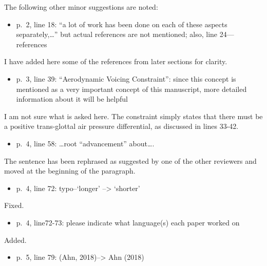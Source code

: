 \documentclass[]{article}
\providecommand{\tightlist}{%
  \setlength{\itemsep}{0pt}\setlength{\parskip}{0pt}}
\begin{document}
The following other minor suggestions are noted:

\begin{itemize}
\tightlist
\item
  p.~2, line 18: ``a lot of work has been done on each of these aspects
  separately,\ldots{}'' but actual references are not mentioned; also,
  line 24---references
\end{itemize}

\color{plum}

I have added here some of the references from later sections for
clarity. \color{black}

\begin{itemize}
\tightlist
\item
  p.~3, line 39: ``Aerodynamic Voicing Constraint'': since this concept
  is mentioned as a very important concept of this manuscript, more
  detailed information about it will be helpful
\end{itemize}

\color{plum}

I am not sure what is asked here. The constraint simply states that
there must be a positive trans-glottal air pressure differential, as
discussed in lines 33-42. \color{black}

\begin{itemize}
\tightlist
\item
  p.~4, line 58: \ldots{}root ``advancement'' about\ldots{}.
\end{itemize}

\color{plum}

The sentence has been rephrased as suggested by one of the other
reviewers and moved at the beginning of the paragraph. \color{black}

\begin{itemize}
\tightlist
\item
  p.~4, line 72: typo--`longer' --\textgreater{} `shorter'
\end{itemize}

\color{plum}

Fixed. \color{black}

\begin{itemize}
\tightlist
\item
  p.~4, line72-73: please indicate what language(s) each paper worked on
\end{itemize}

\color{plum}

Added. \color{black}

\begin{itemize}
\tightlist
\item
  p.~5, line 79: (Ahn, 2018)--\textgreater{} Ahn (2018)
\end{itemize}
\end{document}
